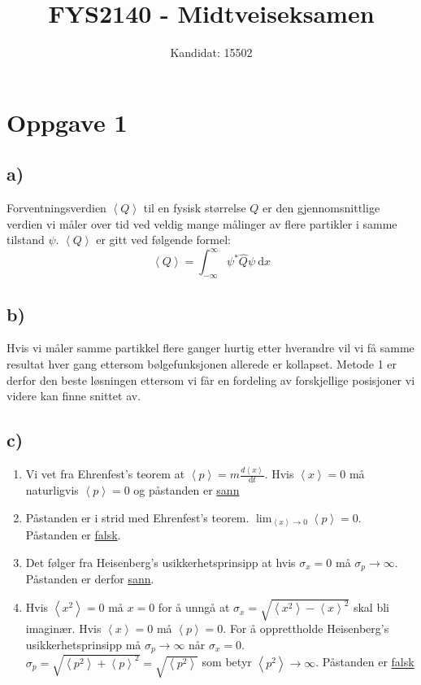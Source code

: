\documentclass[norsk]{article}
\author{Kandidat: 15502}
\title{FYS2140 - Midtveiseksamen}
\date{}
\begin{document}
\maketitle
\newpage

\section*{Oppgave 1}
\subsection*{a)}
Forventningsverdien $\left<Q\right>$ til en fysisk størrelse $Q$ er den gjennomsnittlige verdien vi måler over tid ved veldig mange målinger av flere partikler i samme tilstand $ψ$. $\left<Q\right>$ er gitt ved følgende formel: 
\begin{equation}
\left<Q\right> = ∫_{-∞}^{∞} ψ^{*}\hat{Q} ψ \ \mathrm{d}x
\end{equation}

\subsection*{b)}
Hvis vi måler samme partikkel flere ganger hurtig etter hverandre vil vi få samme resultat hver gang ettersom bølgefunksjonen allerede er kollapset. Metode 1 er derfor den beste løsningen ettersom vi får en fordeling av forskjellige posisjoner vi videre kan finne snittet av. 

\subsection*{c)}
\begin{enumerate}
    \item Vi vet fra Ehrenfest's teorem at $\left<p\right> = m \frac{d\left<x\right>}{\mathrm{d}t}$. Hvis $\left<x\right> = 0$ må naturligvis $\left<p\right> = 0$ og påstanden er \underline{sann}
    \item Påstanden er i strid med Ehrenfest's teorem. $\lim_{\left<x\right> \to 0} \left<p\right> = 0$. Påstanden er \underline{falsk}. 
    \item Det følger fra Heisenberg's usikkerhetsprinsipp at hvis $σ_x = 0$ må $σ_p → ∞$. Påstanden er derfor \underline{sann}. 
    \item Hvis $\left<x^2\right> = 0$ må $x = 0$ for å unngå at $σ_x = \sqrt{\left<x^2\right> - \left<x\right>^2}$ skal bli imaginær. Hvis $\left<x\right>  = 0$ må $\left<p\right> =  0$. For å opprettholde Heisenberg's usikkerhetsprinsipp må $σ_p → ∞$ når $σ_x = 0$. $σ_p = \sqrt{\left<p^2\right> + \left<p\right>^2} = \sqrt{\left<p^2\right>}$ som betyr $\left<p^2\right> → ∞$. Påstanden er \underline{falsk}
\end{enumerate}
\end{document}
